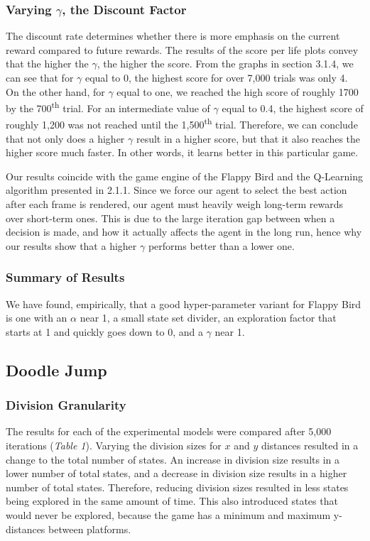 \documentclass[a4paper, 12pt]{article}
\begin{document}
\subsubsection{Varying $\gamma$, the Discount Factor}

The discount rate determines whether there is more emphasis on the current reward compared to future rewards. The results of the score per life plots convey that the higher the $\gamma$, the higher the score. From the graphs in section 3.1.4, we can see that for $\gamma$ equal to 0, the highest score for over 7,000 trials was only 4. On the other hand, for $\gamma$ equal to one, we reached the high score of roughly 1700 by the 700\textsuperscript{th} trial. For an intermediate value of $\gamma$ equal to 0.4, the highest score of roughly 1,200 was not reached until the 1,500\textsuperscript{th} trial. Therefore, we can conclude that not only does a higher $\gamma$ result in a higher score, but that it also reaches the higher score much faster. In other words, it learns better in this particular game.

Our results coincide with the game engine of the Flappy Bird and the Q-Learning algorithm presented in 2.1.1. Since we force our agent to select the best action after each frame is rendered, our agent must heavily weigh long-term rewards over short-term ones. This is due to the large iteration gap between when a decision is made, and how it actually affects the agent in the long run, hence why our results show that a higher $\gamma$ performs better than a lower one.

\subsubsection{Summary of Results}

We have found, empirically, that a good hyper-parameter variant for Flappy Bird is one with an $\alpha$ near 1, a small state set divider, an exploration factor that starts at 1 and quickly goes down to 0, and a $\gamma$ near 1.

\subsection{Doodle Jump}
\subsubsection{Division Granularity}
	The results for each of the experimental models were compared after 5,000 iterations (\textit{Table 1}). Varying the division sizes for $x$ and $y$ distances resulted in a change to the total number of states. An increase in division size results in a lower number of total states, and a decrease in division size results in a higher number of total states. Therefore, reducing division sizes resulted in less states being explored in the same amount of time. This also introduced states that would never be explored, because the game has a minimum and maximum y-distances between platforms.
\end{document}
